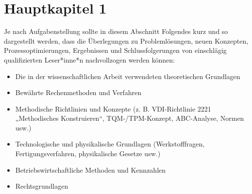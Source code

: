 \chapter{Hauptkapitel 1}
\label{sec: Hauptkapitel 1}

Je nach Aufgabenstellung sollte in diesem Abschnitt Folgendes kurz und so dargestellt werden, dass die Überlegungen zu Problemlösungen, neuen Konzepten, Prozessoptimierungen, Ergebnissen und Schlussfolgerungen von einschlägig qualifizierten Leser*inne*n nachvollzogen werden können:
\begin{itemize}
	\item Die in der wissenschaftlichen Arbeit verwendeten theoretischen Grundlagen
	\item Bewährte Rechenmethoden und Verfahren
	\item Methodische Richtlinien und Konzepte (z. B. VDI-Richtlinie 2221 „Methodisches Konstruieren“, TQM-/TPM-Konzept, ABC-Analyse, Normen usw.)
	\item Technologische und physikalische Grundlagen (Werkstofffragen, Fertigungsverfahren, physikalische Gesetze usw.)
	\item Betriebswirtschaftliche Methoden und Kennzahlen
	\item Rechtsgrundlagen
\end{itemize}